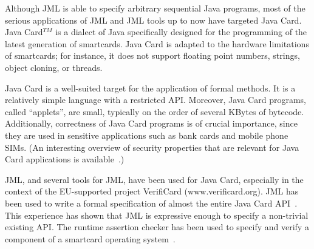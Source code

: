 Although JML is able to specify arbitrary sequential Java programs,
most of the serious applications of JML and JML tools up to now
have targeted Java Card.  Java Card$^{TM}$ is a dialect of Java specifically
designed for the programming of the latest generation of smartcards.
Java Card is adapted to the hardware limitations of smartcards; for
instance, it does not support floating point numbers, strings, object
cloning, or threads.

Java Card is a well-suited target for the application of formal
methods.  It is a relatively simple language with a restricted API\@.
Moreover, Java Card programs, called ``applets'', are small, typically
on the order of several KBytes of bytecode.  Additionally, correctness
of Java Card programs is of crucial importance, since they are used in
sensitive applications such as bank cards and mobile phone SIMs.  (An
interesting overview of security properties that are relevant for Java
Card applications is available~\cite{MarletLM01}.)

JML, and several tools for JML, have been used for Java Card,
especially in the context of the EU-supported project VerifiCard
(www.verificard.org).  JML has been used to write a formal
specification of almost the entire Java Card
API~\cite{PollBergJacobs01}.  This experience has shown that JML is
expressive enough to specify a non-trivial existing API\@.  The
runtime assertion checker has been used to specify and verify a
component of a smartcard operating system~\cite{PollHarteldeJong02}.




